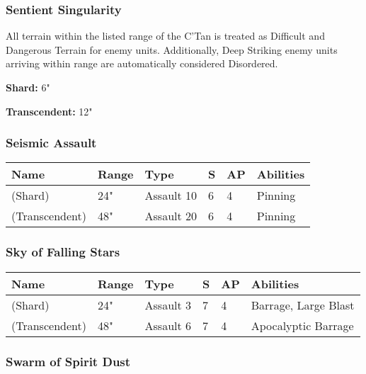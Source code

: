 \subsubsection{Sentient Singularity} \label{Sentient Singularity}

All terrain within the listed range of the C'Tan is treated as Difficult and Dangerous Terrain for enemy units. Additionally, Deep Striking enemy units arriving within range are automatically considered Disordered.

\textbf{Shard:} 6"

\textbf{Transcendent:} 12"

\subsubsection{Seismic Assault} \label{Seismic Assault}

\noindent
\begin{tabular}{||m{160pt} m{31pt} m{55pt} m{12pt} m{12pt} m{200pt}||}
	\hline
	Name & Range & Type & S & AP & Abilities \\
	\hline
	\quickref{Seismic Assault} (Shard) & 24" & Assault 10 & 6 & 4 & Pinning \\
	\quickref{Seismic Assault} (Transcendent) & 48" & Assault 20 & 6 & 4 & Pinning \\
	\hline
\end{tabular}

\subsubsection{Sky of Falling Stars} \label{Sky of Falling Stars}

\noindent
\begin{tabular}{||m{160pt} m{31pt} m{55pt} m{12pt} m{12pt} m{200pt}||}
	\hline
	Name & Range & Type & S & AP & Abilities \\
	\hline
	\quickref{Sky of Falling Stars} (Shard) & 24" & Assault 3 & 7 & 4 & Barrage, Large Blast \\
	\quickref{Sky of Falling Stars} (Transcendent) & 48" & Assault 6 & 7 & 4 & Apocalyptic Barrage \\
	\hline
\end{tabular}

\subsubsection{Swarm of Spirit Dust} \label{Swarm of Spirit Dust}

